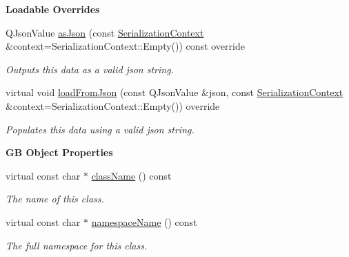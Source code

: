 \begin{Indent}\textbf{ Loadable Overrides}\par
\begin{DoxyCompactItemize}
\item 
\mbox{\label{classrev_1_1_python_script_af070c86ce365515e240a23ef244e81ef}} 
Q\+Json\+Value \mbox{\hyperlink{classrev_1_1_python_script_af070c86ce365515e240a23ef244e81ef}{as\+Json}} (const \mbox{\hyperlink{structrev_1_1_serialization_context}{Serialization\+Context}} \&context=Serialization\+Context\+::\+Empty()) const override
\begin{DoxyCompactList}\small\item\em Outputs this data as a valid json string. \end{DoxyCompactList}\item 
\mbox{\label{classrev_1_1_python_script_aacd7f5481117edfda8c0f88a556ed4be}} 
virtual void \mbox{\hyperlink{classrev_1_1_python_script_aacd7f5481117edfda8c0f88a556ed4be}{load\+From\+Json}} (const Q\+Json\+Value \&json, const \mbox{\hyperlink{structrev_1_1_serialization_context}{Serialization\+Context}} \&context=Serialization\+Context\+::\+Empty()) override
\begin{DoxyCompactList}\small\item\em Populates this data using a valid json string. \end{DoxyCompactList}\end{DoxyCompactItemize}
\end{Indent}
\begin{Indent}\textbf{ GB Object Properties}\par
\begin{DoxyCompactItemize}
\item 
virtual const char $\ast$ \mbox{\hyperlink{classrev_1_1_python_script_ac593ea8f3beeb031d81837b1306bf6ba}{class\+Name}} () const
\begin{DoxyCompactList}\small\item\em The name of this class. \end{DoxyCompactList}\item 
virtual const char $\ast$ \mbox{\hyperlink{classrev_1_1_python_script_ad8a903fd2749527913565f640e5239d6}{namespace\+Name}} () const
\begin{DoxyCompactList}\small\item\em The full namespace for this class. \end{DoxyCompactList}\end{DoxyCompactItemize}
\end{Indent}

